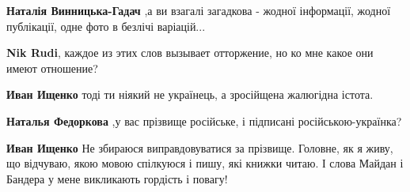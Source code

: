\begin{itemize}
\begin{itemize}
\begin{itemize}
 
\textbf{Наталія Винницька-Гадач} ,а ви взагалі загадкова - жодної інформації, жодної публікації, одне фото в безлічі варіацій...
\end{itemize}

 
\textbf{Nik Rudi}, каждое из этих слов вызывает отторжение, но ко мне какое они имеют отношение?

\begin{itemize}
 
\textbf{Иван Ищенко} тоді ти ніякий не українець, а зросійщена жалюгідна істота.

 
\textbf{Наталья Федоркова} ,у вас прізвище російське, і підписані російською-українка?

 
\textbf{Иван Ищенко} Не збираюся виправдовуватися за прізвище. Головне, як я
живу, що відчуваю, якою мовою спілкуюся і пишу, які книжки читаю. І слова
Майдан і Бандера у мене викликають гордість і повагу!

 

\end{itemize}
\end{itemize}
\end{itemize}
